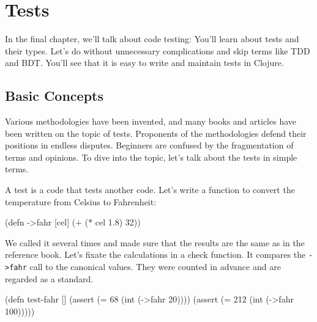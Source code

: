 \chapter{Tests}


\label{chapter-tests}

\begin{teaser}
In the final chapter, we'll talk about code testing: You’ll learn about tests and their types. Let's do without unnecessary complications and skip terms like TDD and BDT. You'll see that it is easy to write and maintain tests in Clojure.
\end{teaser}

\section{Basic Concepts}

Various methodologies have been invented, and many books and articles have been written on the topic of tests. Proponents of the methodologies defend their positions in endless disputes. Beginners are confused by the fragmentation of terms and opinions. To dive into the topic, let's talk about the tests in simple terms.


A test is a code that tests another code. Let's write a function to convert the temperature from Celsius to Fahrenheit:

\begin{english}
  \begin{clojure}
(defn ->fahr [cel]
  (+ (* cel 1.8) 32))
  \end{clojure}
\end{english}


We called it several times and made sure that the results are the same as in the reference book. Let's fixate the calculations in a check function. It compares the \verb|->fahr| call to the canonical values. They were counted in advance and are regarded as a standard.

\begin{english}
  \begin{clojure}
(defn test-fahr []
  (assert (=  68 (int (->fahr 20))))
  (assert (= 212 (int (->fahr 100)))))
  \end{clojure}
\end{english}

